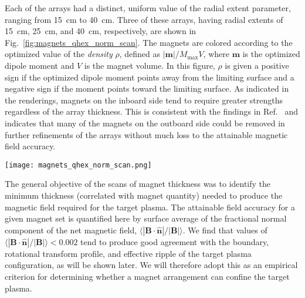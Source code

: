 \documentclass[11pt,onecolumn]{article}
\newcommand{\relbnorm}{\langle|\mathbf{B}\cdot\hat{\mathbf{n}}|
                       /|\mathbf{B}|\rangle}
\begin{document}
Each of the arrays had a distinct, uniform value of the radial extent parameter,
ranging from 15~cm to 40~cm. Three of these arrays, having radial extents
of 15~cm, 25~cm, and 40~cm, respectively, are shown in 
Fig.~\ref{fig:magnets_qhex_norm_scan}.
The magnets are colored according to the optimized value of the 
\textit{density} $\rho$, defined as $|\mathbf{m}|/M_\text{max}V$, where 
$\mathbf{m}$ is the optimized dipole moment and $V$ is the magnet volume.
In this figure, $\rho$ is given a positive sign if the 
optimized dipole moment points away from the limiting surface and 
a negative sign if the moment points toward the limiting surface.
As indicated in the renderings, magnets on the inboard side tend to require
greater strengths regardless of the array thickness. This is consistent with
the findings in Ref.~\cite{zhu2020b} and indicates that many of the magnets
on the outboard side could be removed in further refinements of the arrays
without much loss to the attainable magnetic field accuracy.

\begin{figure*}
    \begin{center}
    \texttt{[image: magnets\_qhex\_norm\_scan.png]}
    \caption{Renderings of arrangements of quadrilaterally-faced hexahedra
             with radial extents of (a) 15 cm, (b) 25 cm, and (c) 40 cm.
             The color scale corresponds to the value of $\rho$ obtained
             from an optimization in which the dipole moment's direction
             was fixed to be along the axis of the hexahedra, locally normal
             to the inner limiting surface. Positive values of $\rho$ correspond
             to the outward direction.}
    \label{fig:magnets_qhex_norm_scan}
    \end{center}
\end{figure*}

The general objective of the scans of magnet thickness was to identify
the minimum thickness (correlated with magnet quantity) needed to produce
the magnetic field required for the target plasma. The attainable field 
accuracy for a given magnet set is quantified here by surface average of the
fractional normal component of the net magnetic field, $\relbnorm$.
We find that values of $\relbnorm < 0.002$
tend to produce good agreement with the boundary, 
rotational transform profile, and effective ripple of the target plasma
configuration, as will be shown later. We will therefore adopt this as
an empirical criterion for determining whether a magnet arrangement can
confine the target plasma.
\end{document}
